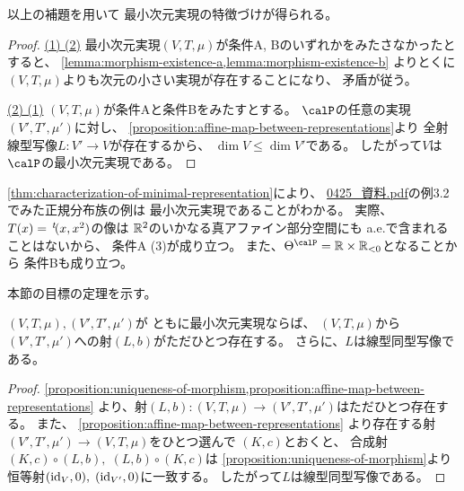 \documentclass[report]{jlreq}
\begin{document}
以上の補題を用いて
最小次元実現の特徴づけが得られる。


\begin{proof}
    \uline{(1) \Rightarrow (2)} \quad
    最小次元実現$(V, T, \mu)$が条件A, Bのいずれかをみたさなかったとすると、
    \cref{lemma:morphism-existence-a,lemma:morphism-existence-b}
    よりとくに$(V, T, \mu)$よりも次元の小さい実現が存在することになり、
    矛盾が従う。

    \uline{(2) \Rightarrow (1)} \quad
    $(V, T, \mu)$が条件Aと条件Bをみたすとする。
    $\calP$の任意の実現
    $(V', T', \mu')$に対し、
    \cref{proposition:affine-map-between-representations}より
    全射線型写像$L: V' \to V$が存在するから、
    $\dim V \le \dim V'$である。
    したがって$V$は$\calP$の最小次元実現である。
\end{proof}

\begin{example}[正規分布族の最小次元実現]
    \cref{thm:characterization-of-minimal-representation}により、
    \url{0425_資料.pdf}の例3.2でみた正規分布族の例は
    最小次元実現であることがわかる。
    実際、
    $T(x) = \,{}^{t}\!(x, x^2)$の像は
    $\mathbb{R}^2$のいかなる真アファイン部分空間にも
    a.e.で含まれることはないから、
    条件A (3)が成り立つ。
    また、$\Theta^\calP = \R \times \R_{< 0}$となることから
    条件Bも成り立つ。
\end{example}

本節の目標の定理を示す。

\begin{theorem}[最小次元実現の間のアファイン変換]
    $(V, T, \mu), (V', T', \mu')$が
    ともに最小次元実現ならば、
    $(V, T, \mu)$から$(V', T', \mu')$への射$(L, b)$がただひとつ存在する。
    さらに、$L$は線型同型写像である。
\end{theorem}

\begin{proof}
    \cref{proposition:uniqueness-of-morphism,proposition:affine-map-between-representations}
    より、射$(L, b) \colon (V, T, \mu) \to (V', T', \mu')$はただひとつ存在する。
    また、
    \cref{proposition:affine-map-between-representations}
    より存在する射$(V', T', \mu') \to (V, T, \mu)$をひとつ選んで
    $(K, c)$とおくと、
    合成射$(K, c) \circ (L, b), \; (L, b) \circ (K, c)$は
    \cref{proposition:uniqueness-of-morphism}より
    恒等射$(\mathrm{id}_V, 0), \; (\mathrm{id}_{V'}, 0)$に一致する。
    したがって$L$は線型同型写像である。
\end{proof}
\end{document}

